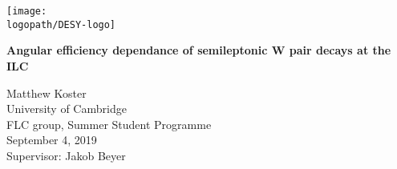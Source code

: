 \begin{titlepage}

  \begin{center}
    \texttt{[image: \\logopath/DESY-logo]}
  \end{center}

  \vspace{0em}

  \begin{minipage}[t]{\textwidth}

    \begin{minipage}{\linewidth}

      \vspace{0em}

      \begin{center}\bfseries\huge
        Angular efficiency dependance of semileptonic W pair decays at the ILC
      \end{center}

      \vspace{1.0 em}

      \begin{center}\large
        Matthew Koster\\
        University of Cambridge\\
        FLC group, Summer Student Programme\\[0.5cm]
        September 4, 2019\\[0.5cm]
        Supervisor: Jakob Beyer
      \end{center}

    \end{minipage}
  \end{minipage}

  \vspace{1cm}

  \begin{abstract}
    
  \end{abstract}

\end{titlepage}
